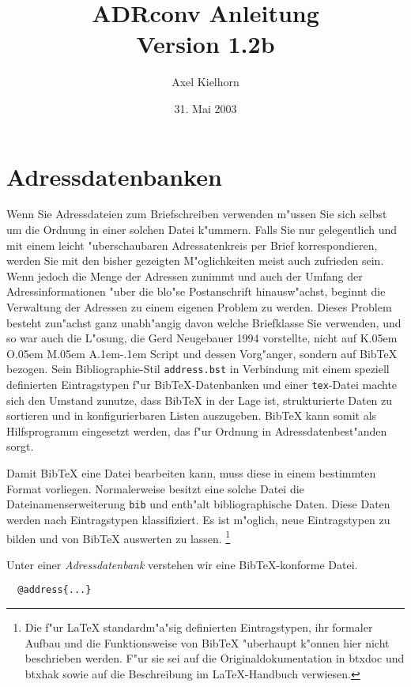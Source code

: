 \documentclass{article}
\title{ADRconv Anleitung\\Version 1.2b}
\author{Axel Kielhorn}
\date{31. Mai 2003}
\newcommand*{\File}[1]{\texttt{#1}}
\DeclareRobustCommand{\KOMAScript}{\textsf{K\kern.05em O\kern.05em%
      M\kern.05em A\kern.1em-\kern.1em Script}}
\begin{document}
\maketitle

\section{Adressdatenbanken}\label{sec:adrconv.database}

Wenn Sie Adressdateien zum Briefschreiben verwenden m"ussen Sie sich selbst
um die Ordnung in einer solchen Datei k"ummern. Falls Sie nur gelegentlich
und mit einem leicht "uberschaubaren Adressatenkreis per Brief
korrespondieren, werden Sie mit den bisher gezeigten M"oglichkeiten meist
auch zufrieden sein. Wenn jedoch die Menge der Adressen zunimmt und auch der
Umfang der Adressinformationen "uber die blo"se Postanschrift hinausw"achst,
beginnt die Verwaltung der Adressen zu einem eigenen Problem zu werden.
Dieses Problem besteht zun"achst ganz unabh"angig davon welche Briefklasse
Sie verwenden, und so war auch die L"osung, die Gerd Neugebauer 1994
vorstellte, nicht auf \KOMAScript{} und dessen Vorg"anger, sondern auf
Bib\TeX{} bezogen. Sein Bibliographie-Stil \File{address.bst} in Verbindung
mit einem speziell definierten Eintragstypen f"ur Bib\TeX-Datenbanken und
einer \File{tex}-Datei machte sich den Umstand zunutze, dass Bib\TeX{} in
der Lage ist, strukturierte Daten zu sortieren und in konfigurierbaren
Listen auszugeben. Bib\TeX{} kann somit als Hilfsprogramm eingesetzt werden,
das f"ur Ordnung in Adressdatenbest"anden sorgt.

Damit Bib\TeX{} eine Datei bearbeiten kann, muss diese in einem 
bestimmten Format vorliegen. Normalerweise besitzt eine solche Datei 
die Dateinamenserweiterung \File{bib} und enth"alt bibliographische 
Daten. Diese Daten werden nach Eintragstypen klassifiziert. Es ist 
m"oglich, neue Eintragstypen zu bilden und von Bib\TeX{} auswerten zu 
lassen.%
\footnote{Die f"ur \LaTeX{} standardm"a"sig definierten Eintragstypen,
ihr formaler Aufbau und die Funktionsweise von Bib\TeX{} "uberhaupt
k"onnen hier nicht beschrieben werden. F"ur sie sei auf die
Originaldokumentation in \textsf{btxdoc} und \textsf{btxhak}
sowie auf die Beschreibung im \LaTeX-Handbuch verwiesen.}

Unter einer \emph{Adressdatenbank} verstehen
wir eine Bib\TeX-konforme Datei.
\begin{verbatim}
  @address{...}
\end{verbatim}
\end{document}
